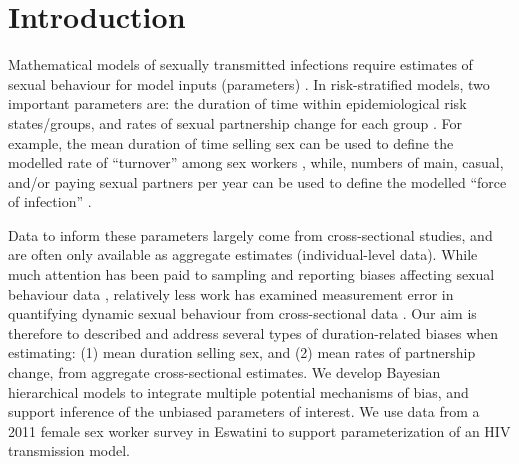 \section{Introduction}
Mathematical models of sexually transmitted infections require
estimates of sexual behaviour for model inputs (parameters) \cite{Garnett2002}.
In risk-stratified models, two important parameters are:
the duration of time within epidemiological risk states/groups, and
rates of sexual partnership change for each group
\cite{Garnett2002,Watts2010,Boily2015,Knight2020}.
For example, the mean duration of time selling sex can be used to define
the modelled rate of ``turnover'' among sex workers \cite{Knight2020},
while, numbers of main, casual, and/or paying sexual partners per year
can be used to define the modelled ``force of infection'' \cite{Boily2015}.
\par
Data to inform these parameters largely come from cross-sectional studies,
and are often only available as aggregate estimates (\vs individual-level data).
While much attention has been paid to
sampling and reporting biases affecting sexual behaviour data \cite{Fenton2001,Langhaug2010},
relatively less work has examined measurement error
in quantifying dynamic sexual behaviour from cross-sectional data \cite{Burington2010,Fazito2012}.
Our aim is therefore to described and address
several types of duration-related biases when estimating:
(1) mean duration selling sex, and (2) mean rates of partnership change,
from aggregate cross-sectional estimates.
We develop Bayesian hierarchical models to
integrate multiple potential mechanisms of bias, and
support inference of the unbiased parameters of interest.
We use data from a 2011 female sex worker survey in Eswatini \cite{Yam2013}
to support parameterization of an HIV transmission model.
